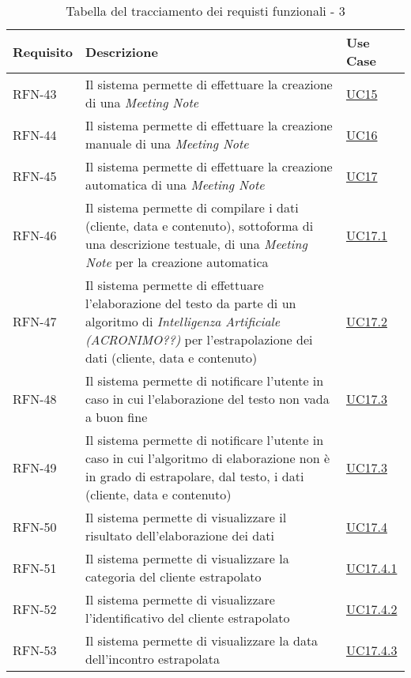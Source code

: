 \begin{table}%
    \caption{Tabella del tracciamento dei requisti funzionali - 3}
    \label{tab:requisiti-funzionali-3}
    \begin{tabularx}{\textwidth}{lXl}
    \hline\hline
    \textbf{Requisito} & \textbf{Descrizione} & \textbf{Use Case}\\
    \hline
    RFN-43 \label{RFN-43} & Il sistema permette di effettuare la creazione di una \emph{Meeting Note} & \hyperref[UC15]{UC15} \\
    \hline
    RFN-44 \label{RFN-44} & Il sistema permette di effettuare la creazione manuale di una \emph{Meeting Note} & \hyperref[UC16]{UC16} \\
    \hline
    RFN-45 \label{RFN-45} & Il sistema permette di effettuare la creazione automatica di una \emph{Meeting Note} & \hyperref[UC17]{UC17} \\
    \hline
    RFN-46 \label{RFN-46} & Il sistema permette di compilare i dati (cliente, data e contenuto), sottoforma di una descrizione testuale, di una \emph{Meeting Note} per la creazione automatica & \hyperref[UC17.1]{UC17.1} \\
    \hline
    RFN-47 \label{RFN-47} & Il sistema permette di effettuare l'elaborazione del testo da parte di un algoritmo di \emph{Intelligenza Artificiale (ACRONIMO??)} per l'estrapolazione dei dati (cliente, data e contenuto) & \hyperref[UC17.2]{UC17.2} \\
    \hline
    RFN-48 \label{RFN-48} & Il sistema permette di notificare l'utente in caso in cui l'elaborazione del testo non vada a buon fine & \hyperref[UC17.3]{UC17.3} \\
    \hline
    RFN-49 \label{RFN-49} & Il sistema permette di notificare l'utente in caso in cui l'algoritmo di elaborazione non è in grado di estrapolare, dal testo, i dati (cliente, data e contenuto) & \hyperref[UC17.3]{UC17.3} \\
    \hline
    RFN-50 \label{RFN-50} & Il sistema permette di visualizzare il risultato dell'elaborazione dei dati & \hyperref[UC17.4]{UC17.4} \\
    \hline
    RFN-51 \label{RFN-51} & Il sistema permette di visualizzare la categoria del cliente estrapolato & \hyperref[UC17.4.1]{UC17.4.1} \\
    \hline
    RFN-52 \label{RFN-52} & Il sistema permette di visualizzare l'identificativo del cliente estrapolato & \hyperref[UC17.4.2]{UC17.4.2} \\
    \hline
    RFN-53 \label{RFN-53} & Il sistema permette di visualizzare la data dell'incontro estrapolata & \hyperref[UC17.4.3]{UC17.4.3} \\

\end{tabularx}
\end{table}
